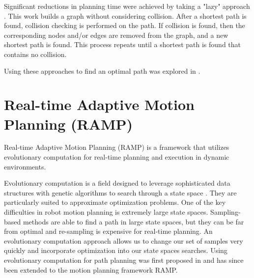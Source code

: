 \documentclass[10pt,conference]{ieeeconf}
\begin{document}
Significant reductions in planning time were achieved by taking a "lazy" approach \cite{bohlin2000path}. This work builds a graph without considering collision. After a shortest path is found, collision checking is performed on the path. If collision is found, then the corresponding nodes and/or edges are removed from the graph, and a new shortest path is found. This process repeats until a shortest path is found that contains no collision.












Using these approaches to find an optimal path was explored in \cite{karaman2011sampling}. 





\section{Real-time Adaptive Motion Planning (RAMP)}
	
Real-time Adaptive Motion Planning (RAMP) \cite{RAMP} is a framework that utilizes evolutionary computation for real-time planning and execution in dynamic environments. 

Evolutionary computation is a field designed to leverage sophisticated data structures with genetic algorithms to search through a state space \cite{michalewicz2013genetic}. They are particularly suited to approximate optimization problems. One of the key difficulties in robot motion planning is extremely large state spaces. Sampling-based methods are able to find a path in large state spaces, but they can be far from optimal and re-sampling is expensive for real-time planning. An evolutionary computation approach allows us to change our set of samples very quickly and incorporate optimization into our state spaces searches. Using evolutionary computation for path planning was first proposed in \cite{EPN_Adaptive} and has since been extended to the motion planning framework RAMP.
\end{document}
